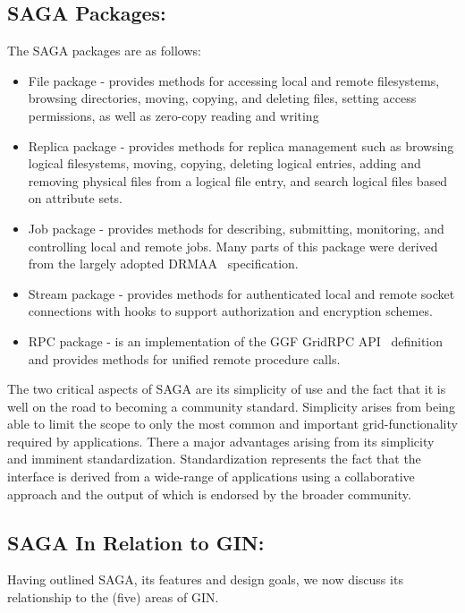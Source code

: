 \documentclass[conference,final]{IEEEtran}
\newenvironment{shortlist}{
  \begin{itemize}
  \setlength{\itemsep}{-0.1em}
}{
  \end{itemize}
}
\begin{document}
\subsection{SAGA Packages:}%

The SAGA packages are as follows:

\begin{shortlist}
\item File package - provides methods for accessing local and remote
  filesystems, browsing directories, moving, copying, and deleting
  files, setting access permissions, as well as zero-copy reading and
  writing
\item Replica package - provides methods for replica management such
  as browsing logical filesystems, moving, copying, deleting logical
  entries, adding and removing physical files from a logical file
  entry, and search logical files based on attribute sets.
\item Job package - provides methods for describing, submitting,
  monitoring, and controlling local and remote jobs. Many parts of
  this package were derived from the largely adopted
  DRMAA~\cite{drmaa_url} specification.
\item Stream package - provides methods for authenticated local and
  remote socket connections with hooks to support authorization and
  encryption schemes.
\item RPC package - is an implementation of the GGF GridRPC
  API~\cite{gridrpc_url} definition and provides methods for unified
  remote procedure calls.
\end{shortlist}

The two critical aspects of SAGA are its simplicity of use and the
fact that it is well on the road to becoming a community standard.
Simplicity arises from being able to limit the scope to only the most
common and important grid-functionality required by applications.
There a major advantages arising from its simplicity and imminent
standardization.  Standardization represents the fact that the
interface is derived from a wide-range of applications using a
collaborative approach and the output of which is endorsed by the
broader community.

\subsection{SAGA In Relation to GIN:}

Having outlined SAGA, its features and design goals, we now discuss
its relationship to the (five) areas of GIN.
\end{document}
